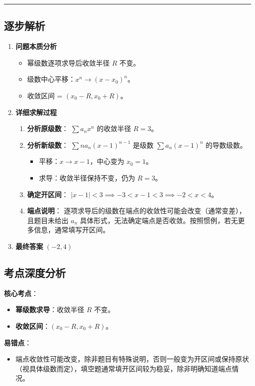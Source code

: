 \documentclass[UTF8,10pt]{ctexart}
\newenvironment{redenv}{\color{red}}{}
\newenvironment{detailedanalysis}{%
    \color{red}
    \begin{enumerate}[label=\textbf{第\arabic*步：}, leftmargin=*, align=left, itemsep=0pt, parsep=0pt, topsep=0pt, partopsep=0pt]
}{%
    \end{enumerate}
}
\newenvironment{conceptbox}{%
    \begin{tcolorbox}[colback=red!5, colframe=red!50!black, title=概念解析, fonttitle=\bfseries, top=2pt, bottom=2pt, left=2pt, right=2pt]
}{%
    \end{tcolorbox}
}
\newcommand{\analysisrule}{\noindent\rule{\textwidth}{0.8pt}\vspace{-0.5em}}
\begin{document}
\begin{redenv}
\analysisrule
\subsection*{逐步解析}

\begin{detailedanalysis}
\item \textbf{问题本质分析}
\begin{itemize}
    \item 幂级数逐项求导后收敛半径 $R$ 不变。
    \item 级数中心平移：$x^n \to (x-x_0)^n$。
    \item 收敛区间 = $(x_0-R, x_0+R)$。
\end{itemize}

\item \textbf{详细求解过程}
\begin{enumerate}[label=(\alph*)]
    \item \textbf{分析原级数}：
    $\sum a_n x^n$ 的收敛半径 $R=3$。
    \item \textbf{分析新级数}：
    $\sum n a_n (x-1)^{n-1}$ 是级数 $\sum a_n (x-1)^n$ 的导数级数。
    \begin{itemize}
        \item 平移：$x \to x-1$，中心变为 $x_0=1$。
        \item 求导：收敛半径保持不变，仍为 $R=3$。
    \end{itemize}
    \item \textbf{确定开区间}：
    $|x-1| < 3 \implies -3 < x-1 < 3 \implies -2 < x < 4$。
    \item \textbf{端点说明}：
     逐项求导后的级数在端点的收敛性可能会改变（通常变差），且题目未给出 $a_n$ 具体形式，无法确定端点是否收敛。按照惯例，若无更多信息，通常填写开区间。
\end{enumerate}

\item \textbf{最终答案}
$(-2, 4)$
\end{detailedanalysis}

\subsection*{考点深度分析}
\begin{conceptbox}
\textbf{核心考点}：
\begin{itemize}
    \item \textbf{幂级数求导}：收敛半径 $R$ 不变。
    \item \textbf{收敛区间}：$(x_0-R, x_0+R)$。
\end{itemize}
\textbf{易错点}：
\begin{itemize}
    \item 端点收敛性可能改变，除非题目有特殊说明，否则一般变为开区间或保持原状（视具体级数而定），填空题通常填开区间较为稳妥，除非明确知道端点情况。
\end{itemize}
\end{conceptbox}
\end{redenv}
\end{document}
